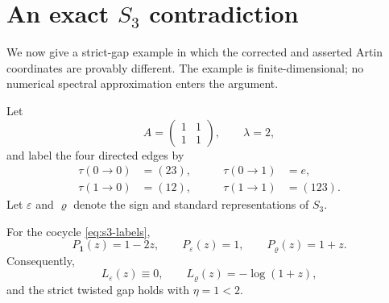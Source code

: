 \section{An exact \texorpdfstring{\(S_3\)}{S3} contradiction}
\label{sec:s3-witness}

We now give a strict-gap example in which the corrected and asserted Artin
coordinates are provably different.  The example is finite-dimensional; no
numerical spectral approximation enters the argument.

Let
\[
  A=\begin{pmatrix}1&1\\1&1\end{pmatrix},
  \qquad \lambda=2,
\]
and label the four directed edges by
\begin{equation}\label{eq:s3-labels}
 \begin{aligned}
  \tau(0\to0)&=(23),&\qquad \tau(0\to1)&=e,\\
  \tau(1\to0)&=(12),&\qquad \tau(1\to1)&=(123).
 \end{aligned}
\end{equation}
Let \(\varepsilon\) and \(\varrho\) denote the sign and standard
representations of \(S_3\).

\begin{lemma}\label{lem:s3-determinants}
For the cocycle \eqref{eq:s3-labels},
\begin{equation}\label{eq:s3-polynomials}
  P_{\mathbf1}(z)=1-2z,
  \qquad P_\varepsilon(z)=1,
  \qquad P_\varrho(z)=1+z.
\end{equation}
Consequently,
\begin{equation}\label{eq:s3-artin-values}
  L_\varepsilon(z)\equiv0,
  \qquad L_\varrho(z)=-\log(1+z),
\end{equation}
and the strict twisted gap holds with \(\eta=1<2\).
\end{lemma}

